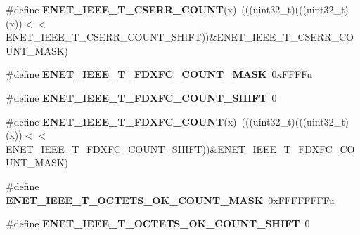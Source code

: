 \begin{DoxyCompactItemize}
\item 
\#define {\bfseries E\+N\+E\+T\+\_\+\+I\+E\+E\+E\+\_\+\+T\+\_\+\+C\+S\+E\+R\+R\+\_\+\+C\+O\+U\+NT}(x)~(((uint32\+\_\+t)(((uint32\+\_\+t)(x))$<$$<$E\+N\+E\+T\+\_\+\+I\+E\+E\+E\+\_\+\+T\+\_\+\+C\+S\+E\+R\+R\+\_\+\+C\+O\+U\+N\+T\+\_\+\+S\+H\+I\+FT))\&E\+N\+E\+T\+\_\+\+I\+E\+E\+E\+\_\+\+T\+\_\+\+C\+S\+E\+R\+R\+\_\+\+C\+O\+U\+N\+T\+\_\+\+M\+A\+SK)\hypertarget{group__ENET__Register__Masks_gaecf8a547340b8a07699467f79f3989fc}{}\label{group__ENET__Register__Masks_gaecf8a547340b8a07699467f79f3989fc}

\item 
\#define {\bfseries E\+N\+E\+T\+\_\+\+I\+E\+E\+E\+\_\+\+T\+\_\+\+F\+D\+X\+F\+C\+\_\+\+C\+O\+U\+N\+T\+\_\+\+M\+A\+SK}~0x\+F\+F\+F\+Fu\hypertarget{group__ENET__Register__Masks_gab017cc2737c10a8709398a3a47dc3ade}{}\label{group__ENET__Register__Masks_gab017cc2737c10a8709398a3a47dc3ade}

\item 
\#define {\bfseries E\+N\+E\+T\+\_\+\+I\+E\+E\+E\+\_\+\+T\+\_\+\+F\+D\+X\+F\+C\+\_\+\+C\+O\+U\+N\+T\+\_\+\+S\+H\+I\+FT}~0\hypertarget{group__ENET__Register__Masks_ga122b6e4e5176d31a1f66b7f04c18826f}{}\label{group__ENET__Register__Masks_ga122b6e4e5176d31a1f66b7f04c18826f}

\item 
\#define {\bfseries E\+N\+E\+T\+\_\+\+I\+E\+E\+E\+\_\+\+T\+\_\+\+F\+D\+X\+F\+C\+\_\+\+C\+O\+U\+NT}(x)~(((uint32\+\_\+t)(((uint32\+\_\+t)(x))$<$$<$E\+N\+E\+T\+\_\+\+I\+E\+E\+E\+\_\+\+T\+\_\+\+F\+D\+X\+F\+C\+\_\+\+C\+O\+U\+N\+T\+\_\+\+S\+H\+I\+FT))\&E\+N\+E\+T\+\_\+\+I\+E\+E\+E\+\_\+\+T\+\_\+\+F\+D\+X\+F\+C\+\_\+\+C\+O\+U\+N\+T\+\_\+\+M\+A\+SK)\hypertarget{group__ENET__Register__Masks_ga8c8fc6886dc17857025cdbc8da521a39}{}\label{group__ENET__Register__Masks_ga8c8fc6886dc17857025cdbc8da521a39}

\item 
\#define {\bfseries E\+N\+E\+T\+\_\+\+I\+E\+E\+E\+\_\+\+T\+\_\+\+O\+C\+T\+E\+T\+S\+\_\+\+O\+K\+\_\+\+C\+O\+U\+N\+T\+\_\+\+M\+A\+SK}~0x\+F\+F\+F\+F\+F\+F\+F\+Fu\hypertarget{group__ENET__Register__Masks_ga6f934fd96f95ccb0d4faa6c215f86cf7}{}\label{group__ENET__Register__Masks_ga6f934fd96f95ccb0d4faa6c215f86cf7}

\item 
\#define {\bfseries E\+N\+E\+T\+\_\+\+I\+E\+E\+E\+\_\+\+T\+\_\+\+O\+C\+T\+E\+T\+S\+\_\+\+O\+K\+\_\+\+C\+O\+U\+N\+T\+\_\+\+S\+H\+I\+FT}~0\hypertarget{group__ENET__Register__Masks_ga56ee9e359f04a1e6250f1fb5bf0ce288}{}\label{group__ENET__Register__Masks_ga56ee9e359f04a1e6250f1fb5bf0ce288}


\end{DoxyCompactItemize}
